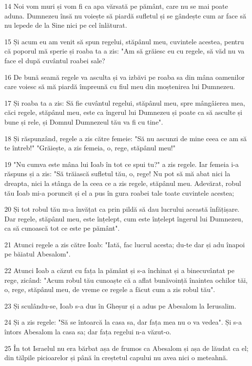 \par 14 Noi vom muri și vom fi ca apa vărsată pe pământ, care nu se mai poate aduna. Dumnezeu însă nu voiește să piardă sufletul și se gândește cum ar face să nu lepede de la Sine nici pe cel înlăturat.
\par 15 Și acum eu am venit să spun regelui, stăpânul meu, cuvintele acestea, pentru că poporul mă sperie și roaba ta a zis: "Am să grăiesc eu cu regele, să văd nu va face el după cuvântul roabei sale?
\par 16 De bună seamă regele va asculta și va izbăvi pe roaba sa din mâna oamenilor care voiesc să mă piardă împreună cu fiul meu din moștenirea lui Dumnezeu.
\par 17 Și roaba ta a zis: Să fie cuvântul regelui, stăpânul meu, spre mângâierea mea, căci regele, stăpânul meu, este ca îngerul lui Dumnezeu și poate ca să asculte și bune și rele, și Domnul Dumnezeul tău va fi cu tine".
\par 18 Și răspunzând, regele a zis către femeie: "Să nu ascunzi de mine ceea ce am să te întreb!" "Grăiește, a zis femeia, o, rege, stăpânul meu!"
\par 19 "Nu cumva este mâna lui Ioab în tot ce spui tu?" a zis regele. Iar femeia i-a răspuns și a zis: "Să trăiască sufletul tău, o, rege! Nu pot să mă abat nici la dreapta, nici la stânga de la ceea ce a zis regele, stăpânul meu. Adevărat, robul tău Ioab mi-a poruncit și el a pus în gura roabei tale toate cuvintele acestea;
\par 20 Și tot robul tău m-a învățat ca prin pildă să dau lucrului această înfățișare. Dar regele, stăpânul meu, este înțelept, cum este înțelept îngerul lui Dumnezeu, ca să cunoască tot ce este pe pământ".
\par 21 Atunci regele a zis către Ioab: "Iată, fac lucrul acesta; du-te dar și adu înapoi pe băiatul Abesalom".
\par 22 Atunci Ioab a căzut cu fața la pământ și s-a închinat și a binecuvântat pe rege, zicând: "Acum robul tău cunoaște că a aflat bunăvoință înaintea ochilor tăi, o, rege, stăpânul meu, de vreme ce regele a făcut cum a zis robul tău".
\par 23 Și sculându-se, Ioab s-a dus în Gheșur și a adus pe Abesalom la Ierusalim.
\par 24 Și a zis regele: "Să se întoarcă la casa sa, dar fața mea nu o va vedea". Și s-a întors Abesalom la casa sa; dar fața regelui n-a văzut-o.
\par 25 În tot Israelul nu era bărbat așa de frumos ca Abesalom și așa de lăudat ca el; din tălpile picioarelor și până în creștetul capului nu avea nici o meteahnă.
